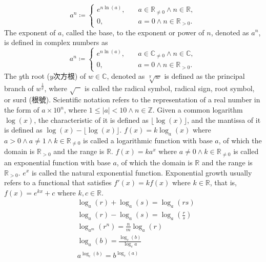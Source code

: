 \documentclass[a4paper,12pt]{article}
\begin{document}
\[a^n\coloneq\begin{cases}
e^{n\ln(a)},\quad & a\in\mathbb{R}_{\neq 0}\land n\in\mathbb{R},\\
0,\quad & a=0\land n\in\mathbb{R}_{>0}.
\end{cases}\]
The exponent of $a$, called the base, to the exponent or power of $n$, denoted as $a^n$, is defined in complex numbers as
\[a^n\coloneq\begin{cases}
e^{n\ln(a)},\quad & a\in\mathbb{C}_{\neq 0}\land n\in\mathbb{C},\\
0,\quad & a=0\land n\in\mathbb{R}_{>0}.
\end{cases}\]
The $y$th root ($y$次方根) of $w\in\mathbb{C}$, denoted as $\sqrt[y]{w}$ is defined as the principal branch of $w^{\frac{1}{y}}$, where $\sqrt{\phantom{w}}$ is called the radical symbol, radical sign, root symbol, or surd (根號).
Scientific notation refers to the representation of a real number in the form of $a\times 10^n$, where $1\leq |a|<10\land n\in\mathbb{Z}$.
Given a common logarithm $\log(x)$, the characteristic of it is defined as $\lfloor\log(x)\rfloor$, and the mantissa of it is defined as $\log(x)-\lfloor\log(x)\rfloor$.
$f(x)=k\log_a(x)$ where $a>0\land a\neq 1\land k\in\mathbb{R}_{\neq 0}$ is called a logarithmic function with base $a$, of which the domain is $\mathbb{R}_{>0}$ and the range is $\mathbb{R}$.
$f(x)=ka^x$ where $a\neq 0\land k\in\mathbb{R}_{\neq 0}$ is called an exponential function with base $a$, of which the domain is $\mathbb{R}$ and the range is $\mathbb{R}_{>0}$.
$e^x$ is called the natural exponential function.
Exponential growth usually refers to a functional that satisfies $f'(x)=kf(x)$ where $k\in\mathbb{R}$, that is, $f(x)=e^{kx}+c$ where $k,c\in\mathbb{R}$.
\[\begin{aligned}
& \log_a(r)+\log_a(s)=\log_a(rs)\\
& \log_a(r)-\log_a(s)=\log_a\left(\frac{r}{s}\right)\\
& \log_{a^m}(r^n)=\frac{n}{m}\log_a(r)\\
& \log_a(b)=\frac{\log_c(b)}{\log_c{a}}\\
& a^{\log_c(b)}=b^{\log_c(a)}
\end{aligned}\]
\end{document}

